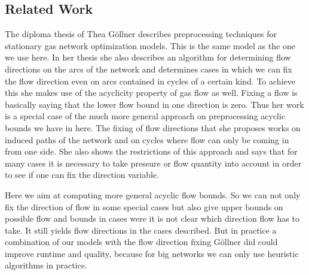 \subsection{Related Work}
The diploma thesis of Thea Göllner \cite{DiplomarbeitTheaGoellner} describes preprocessing techniques for stationary gas 
network optimization models. This is the same model as the one we use here. In her thesis she also describes an 
algorithm for determining flow directions on the arcs of the network and determines cases in which we can fix the flow 
direction even on arcs contained in cycles of a certain kind. To achieve this she makes use of the acyclicity property 
of gas flow as well. 
Fixing a flow is basically saying that the lower flow bound in one direction is zero. Thus her work is a special case 
of the much more general approach on preprocessing acyclic bounds we have in here. The fixing of flow directions that 
she proposes works on induced paths of the network and on cycles where flow can only be coming in from one side. 
She also shows the restrictions of this approach and says that for many cases it is necessary to take pressure or flow 
quantity into account in order to see if one can fix the direction variable. 

Here we aim at computing more general acyclic flow bounds. So we can not only fix the direction of flow in some special 
cases but also give upper bounds on possible flow and bounds in cases were it is not clear which direction flow has to 
take. It still yields flow directions in the cases described. But in practice a combination of our models with the 
flow direction fixing Göllner did could improve runtime and quality, because for big networks we can only use heuristic 
algorithms in practice.
